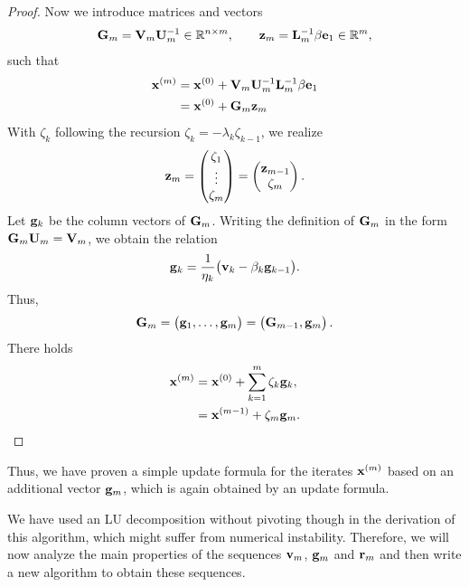 \begin{proof}
  Now we introduce matrices and vectors
  \begin{gather}
    \mathbf G_m = \mathbf V_m \mathbf U_m^{-1} \in \mathbb R^{n\times m},
    \qquad \mathbf z_m = \mathbf L_m^{-1} \beta \mathbf e_1\in \mathbb R^m,
  \end{gather}
  such that
  \begin{align}
    \mathbf x^{(m)}
    &= \mathbf x^{(0)} + \mathbf V_m \mathbf U_m^{-1} \mathbf L_m^{-1} \beta \mathbf e_1\\
    &= \mathbf x^{(0)} + \mathbf G_m \mathbf z_m
  \end{align}
  With $\zeta_k$ following the recursion
  $\zeta_k = - \lambda_k \zeta_{k-1}$, we realize
  \begin{gather}
    \mathbf z_m =
    \begin{pmatrix}
      \zeta_1\\\vdots\\\zeta_m
    \end{pmatrix}
    =
    \begin{pmatrix}
      \mathbf z_{m-1}\\\zeta_m
    \end{pmatrix}.
  \end{gather}
  Let $\mathbf g_k$ be the column vectors of $\mathbf G_m$. Writing the
  definition of $\mathbf G_m$ in the form $\mathbf G_m \mathbf U_m = \mathbf V_m$, we
  obtain the relation
  \begin{gather}
    \label{eq:nla:krylov:lanczos-p}
    \mathbf g_k = \frac1{\eta_k}\bigl(\mathbf v_k - \beta_k \mathbf g_{k-1}\bigr).
  \end{gather}
  Thus,
  \begin{gather}
    \mathbf G_m =
    \begin{pmatrix}
      \mathbf g_1,\dots,\mathbf g_m
    \end{pmatrix}
    =
    \begin{pmatrix}
      \mathbf G_{m-1},\mathbf g_m
    \end{pmatrix}.
  \end{gather}
  There holds
  \begin{align}
    \mathbf x^{(m)}
    &= \mathbf x^{(0)} + \sum_{k=1}^m \zeta_k \mathbf g_k,\\
    &= \mathbf x^{(m-1)} + \zeta_m \mathbf g_m.
  \end{align}
\end{proof}

\begin{remark}
  Thus, we have proven a simple update formula for the iterates
  $\mathbf x^{(m)}$ based on an additional vector $\mathbf g_m$, which is again
  obtained by an update formula.

  We have used an LU decomposition without pivoting though in the
  derivation of this algorithm, which might suffer from numerical
  instability. Therefore, we will now analyze the main properties of
  the sequences $\mathbf v_m$, $\mathbf g_m$ and $\mathbf r_m$ and then write a new
  algorithm to obtain these sequences.
\end{remark}

